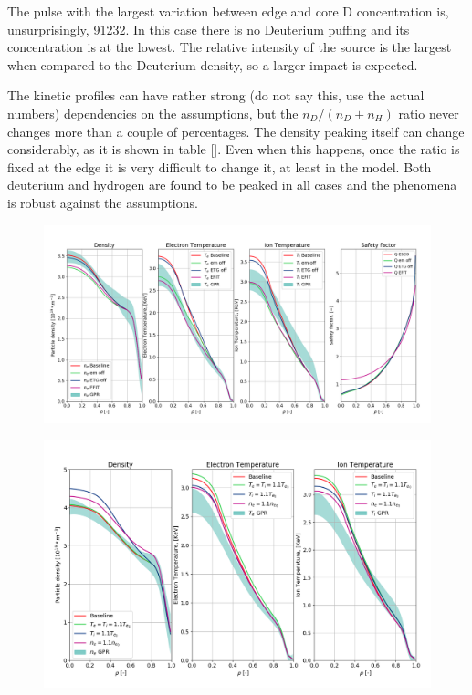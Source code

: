 \documentclass[a4paper,10pt]{iopart}
\begin{document}
The pulse with the largest variation between edge and core D concentration is, unsurprisingly, 91232. In this case there is no Deuterium puffing and its concentration is at the lowest. The relative intensity of the source is the largest when compared to the Deuterium density, so a larger impact is expected.

The kinetic profiles can have rather strong (do not say this, use the actual numbers) dependencies on the assumptions, but the $ n_{D}/(n_{D}+n_{H}) $ ratio never changes more than a couple of percentages. The density peaking itself can change considerably, as it is shown in table []. Even when this happens, once the ratio is fixed at the edge it is very difficult to change it, at least in the model. Both deuterium and hydrogen are found to be peaked in all cases and the phenomena is robust against the assumptions.

\begin{figure}
	\centering
	\includegraphics[width=0.9\linewidth]{Plots/91232_sensitivities}
	\caption{}
	\label{fig:91232sensitivities}
\end{figure}

\begin{figure}
	\centering
	\includegraphics[width=0.9\linewidth]{Plots/91227_Ti_Te}
	\caption{}
	\label{fig:91227tite}
\end{figure}
\end{document}
